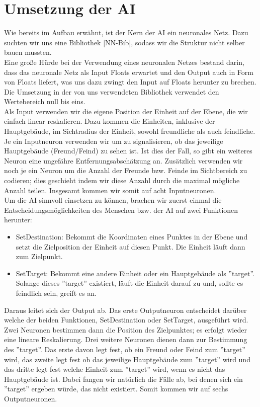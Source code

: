 \documentclass[
	12pt,
	a4paper,
	BCOR10mm,
	DIV14,
	headsepline,
	usegeometry,
]{scrreprt}
\begin{document}
\section{Umsetzung der AI}
Wie bereits im Aufbau erwähnt, ist der Kern der AI ein neuronales Netz. Dazu suchten wir uns eine Bibliothek [NN-Bib], sodass wir die Struktur nicht selber bauen mussten.\\
Eine große Hürde bei der Verwendung eines neuronalen Netzes bestand darin, dass das neuronale Netz als Input Floats erwartet und den Output auch in Form von Floats liefert, was uns dazu zwingt den Input auf Floats herunter zu brechen. Die Umsetzung in der von uns verwendeten Bibliothek verwendet den Wertebereich null bis eins.\\
Als Input verwenden wir die eigene Position der Einheit auf der Ebene, die wir einfach linear reskalieren. Dazu kommen die Einheiten, inklusive der Hauptgebäude, im Sichtradius der Einheit, sowohl freundliche als auch feindliche. Je ein Inputneuron verwenden wir um zu signalisieren, ob das jeweilige Hauptgebäude (Freund/Feind) zu sehen ist. Ist dies der Fall, so gibt ein weiteres Neuron eine ungefähre Entfernungsabschätzung an. Zusätzlich verwenden wir noch je ein Neuron um die Anzahl der Freunde bzw. Feinde im Sichtbereich zu codieren; dies geschieht indem wir diese Anzahl durch die maximal mögliche Anzahl teilen. Insgesamt kommen wir somit auf acht Inputneuronen.\\
Um die AI sinnvoll einsetzen zu können, brachen wir zuerst einmal die Entscheidungsmöglichkeiten des Menschen bzw. der AI auf zwei Funktionen herunter: 
\begin{itemize}
	\item SetDestination: Bekommt die Koordinaten eines Punktes in der Ebene und setzt die Zielposition der Einheit auf diesen Punkt. Die Einheit läuft dann zum Zielpunkt.
	\item SetTarget: Bekommt eine andere Einheit oder ein Hauptgebäude als ''target''. Solange dieses ''target'' existiert, läuft die Einheit darauf zu und, sollte es feindlich sein, greift es an.
\end{itemize}
Daraus leitet sich der Output ab. Das erste Outputneuron entscheidet darüber welche der beiden Funktionen, SetDestination oder SetTarget, ausgeführt wird. Zwei Neuronen bestimmen dann die Position des Zielpunktes; es erfolgt wieder eine lineare Reskalierung. Drei weitere Neuronen dienen dann zur Bestimmung des ''target''. Das erste davon legt fest, ob ein Freund oder Feind zum ''target'' wird, das zweite legt fest ob das jeweilige Hauptgebäude zum ''target'' wird und das dritte legt fest welche Einheit zum ''target'' wird, wenn es nicht das Hauptgebäude ist. Dabei fangen wir natürlich die Fälle ab, bei denen sich ein ''target'' ergeben würde, das nicht existiert. Somit kommen wir auf sechs Outputneuronen.\\ 
\end{document}
